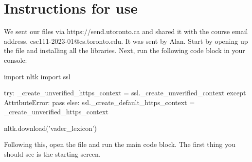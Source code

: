 \documentclass[fontsize=11pt]{article}
\begin{document}
\section{Instructions for use}
We sent our files via  https://send.utoronto.ca and shared it with the course email address, csc111-2023-01@cs.toronto.edu. It was sent by Alan. Start by opening up the  file and installing all the libraries. Next, run the following code block in your console:
\begin{python}
import nltk
import ssl

try:
    _create_unverified_https_context = ssl._create_unverified_context
except AttributeError:
    pass
else:
    ssl._create_default_https_context = _create_unverified_https_context

nltk.download('vader_lexicon')
\end{python}
Following this, open the  file and run the main code block.
The first thing you should see is the starting screen.
\end{document}
